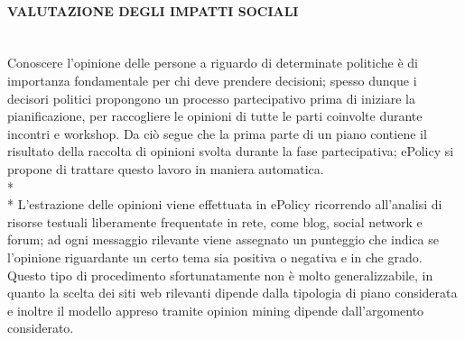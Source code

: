\documentclass[12pt,a4paper,openright,twoside]{report}
\newcommand{\myparagraph}[1]{\paragraph{#1}\mbox{}\\}
\begin{document}
\myparagraph{VALUTAZIONE DEGLI IMPATTI SOCIALI}
Conoscere l'opinione delle persone a riguardo di determinate politiche è di importanza fondamentale per chi deve prendere decisioni; spesso dunque i decisori politici propongono un processo partecipativo prima di iniziare la pianificazione, per raccogliere le opinioni di tutte le parti coinvolte durante incontri e workshop. Da ciò segue che la prima parte di un piano contiene il risultato della raccolta di opinioni svolta durante la fase partecipativa; ePolicy si propone di trattare questo lavoro in maniera automatica.\\*\\*
L'estrazione delle opinioni viene effettuata in ePolicy ricorrendo all'analisi di risorse testuali liberamente frequentate in rete, come blog, social network e forum; ad ogni messaggio rilevante viene assegnato un punteggio che indica se l'opinione riguardante un certo tema sia positiva o negativa e in che grado. Questo tipo di procedimento sfortunatamente non è molto generalizzabile, in quanto la scelta dei siti web rilevanti dipende dalla tipologia di piano considerata e inoltre il modello appreso tramite opinion mining dipende dall'argomento considerato.
\end{document}
